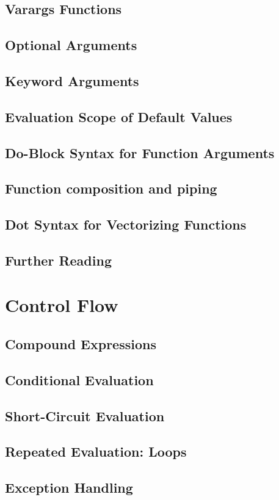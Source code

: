     \section{Varargs Functions}
    \section{Optional Arguments}
    \section{Keyword Arguments}
    \section{Evaluation Scope of Default Values}
    \section{Do-Block Syntax for Function Arguments}
    \section{Function composition and piping}
    \section{Dot Syntax for Vectorizing Functions}
    \section{Further Reading}
  \chapter{Control Flow}
    \section{Compound Expressions}
    \section{Conditional Evaluation}
    \section{Short-Circuit Evaluation}
    \section{Repeated Evaluation: Loops}
    \section{Exception Handling}
